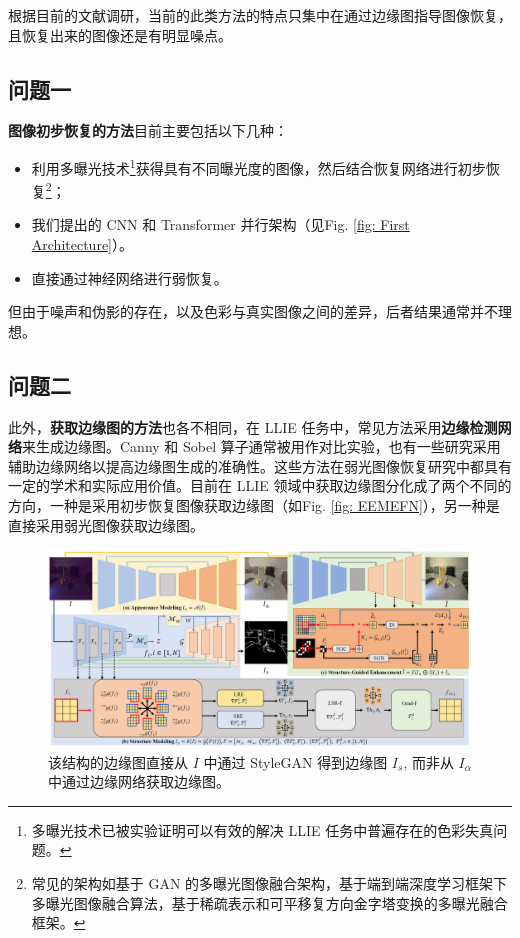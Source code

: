 \documentclass[a4paper]{ctexart}
\begin{document}
	根据目前的文献调研，当前的此类方法的特点只集中在通过边缘图指导图像恢复，且恢复出来的图像还是有明显噪点。
	
	\subsection{问题一} 
	
	\textbf{图像初步恢复的方法}目前主要包括以下几种：
	
	\begin{itemize}
		\item[(1)] 
		利用多曝光技术\footnote{多曝光技术已被实验证明可以有效的解决 LLIE 任务中普遍存在的色彩失真问题。}获得具有不同曝光度的图像，然后结合恢复网络进行初步恢复\footnote{常见的架构如基于 GAN 的多曝光图像融合架构，基于端到端深度学习框架下多曝光图像融合算法，基于稀疏表示和可平移复方向金字塔变换的多曝光融合框架。}；
		
		\item[(2)]
		我们提出的 CNN 和 Transformer 并行架构（见Fig. \ref{fig: First Architecture}）。
		
		\item[(3)]
		直接通过神经网络进行弱恢复。
		
	\end{itemize}	
	
	但由于噪声和伪影的存在，以及色彩与真实图像之间的差异，后者结果通常并不理想。
	
	\subsection{问题二} 
	
	此外，\textbf{获取边缘图的方法}也各不相同，在 LLIE 任务中，常见方法采用\textbf{边缘检测网络}来生成边缘图。Canny 和 Sobel 算子通常被用作对比实验，也有一些研究采用辅助边缘网络以提高边缘图生成的准确性。这些方法在弱光图像恢复研究中都具有一定的学术和实际应用价值。目前在 LLIE 领域中获取边缘图分化成了两个不同的方向，一种是采用初步恢复图像获取边缘图（如Fig. \ref{fig: EEMEFN}），另一种是直接采用弱光图像获取边缘图。
	
	\begin{figure}[htbp]
		\centering 
		\includegraphics[width=\columnwidth]{picture/LLIE/Structure Modeling and Guidance/Overview}
		\caption{
			\label{fig: Overview} 
			该结构的边缘图直接从 $I$ 中通过 StyleGAN 得到边缘图 $I_s$, 而非从 $I_{\alpha}$ 中通过边缘网络获取边缘图。
		}
	\end{figure}
	
\end{document}
